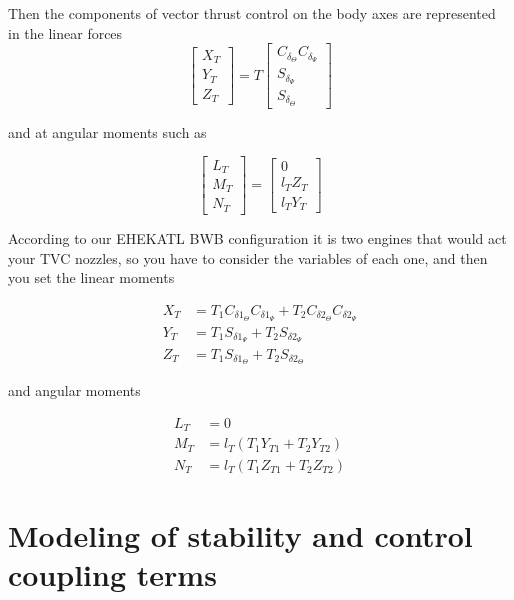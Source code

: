 Then the components of vector thrust control on the body axes are represented in the linear forces 
\begin{equation}
\begin{bmatrix}
X_{T} \\
Y_{T} \\
Z_{T}
\end{bmatrix}
=
T
\begin{bmatrix}
C_{\delta_{\Theta}} C_{\delta_{\Psi}} \\
S_{\delta_{\Psi}} \\
S_{\delta_{\Theta}}
\end{bmatrix}
\end{equation}

and at angular moments such as

\begin{equation}
\begin{bmatrix}
L_{T} \\
M_{T} \\
N_{T}
\end{bmatrix}
=
\begin{bmatrix}
0 \\
l_T Z_{T} \\
l_T Y_{T}
\end{bmatrix}
\end{equation}

According to our EHEKATL BWB configuration it is two engines that would act your TVC nozzles, so you have to consider the variables of each one, and then you set the linear moments

\begin{align}
    X_T &= T_{1} C_{\delta1_{\Theta}} C_{\delta1_{\Psi}} + T_{2} C_{\delta2_{\Theta}} C_{\delta2_{\Psi}} \\
    Y_T &= T_{1} S_{\delta1_{\Psi}} + T_{2} S_{\delta2_{\Psi}} \\
    Z_T &= T_{1} S_{\delta1_{\Theta}} + T_{2} S_{\delta2_{\Theta}}
\end{align}

and angular moments

\begin{align}
    L_T &= 0 \\
    M_T &= l_T(T_1 Y_{T1} + T_2 Y_{T2}) \\
    N_T &= l_T(T_1 Z_{T1} + T_2 Z_{T2})
\end{align}

\section{Modeling of stability and control coupling terms}

